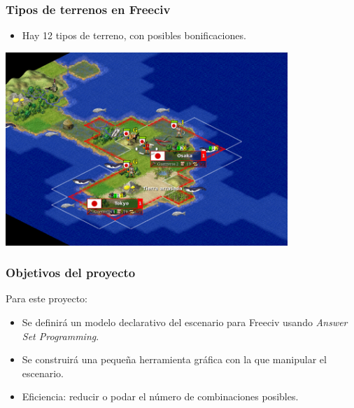 \begin{frame}
\frametitle{Tipos de terrenos en Freeciv}

\begin{itemize}
	\item Hay \textcolor{UDCpink}{12 tipos de terreno}, con posibles bonificaciones.
\end{itemize}

\vspace{0.5em}

\centering
\includegraphics[width=0.8\textwidth]{images/ejemplo-partida.png}
\end{frame}


\begin{frame}
\frametitle{Objetivos del proyecto}

Para este proyecto:

\vspace{1em}

\begin{itemize}
	\item<1-> Se definirá un \textcolor{UDCpink}{modelo declarativo} del escenario para Freeciv usando \textcolor{UDCpink}{\itshape Answer Set Programming}.
	
	\vspace{1em}
	
	\item<2-> Se construirá una pequeña \textcolor{UDCpink}{herramienta gráfica} con la que manipular el escenario.
	
	\vspace{1em}
	
	\item<3-> Eficiencia: reducir o podar el número de combinaciones posibles.
\end{itemize}

\end{frame}
